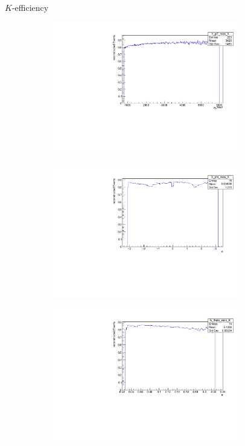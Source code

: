 \documentclass[11pt]{beamer}
\begin{document}
\begin{frame}{$K$-efficiency}
\begin{figure}
\begin{subfigure}{0.45\textwidth}
\includegraphics[width=0.9\textwidth]{up_pdf/h_pt_reco_K.pdf}
\end{subfigure}
\begin{subfigure}{0.45\textwidth}
\includegraphics[width=0.9\textwidth]{up_pdf/h_phi_reco_K.pdf}
\end{subfigure}
\begin{subfigure}{0.45\textwidth}
\includegraphics[width=0.9\textwidth]{up_pdf/h_theta_reco_K.pdf}

\end{subfigure}
\end{figure}
\end{frame}
\end{document}
